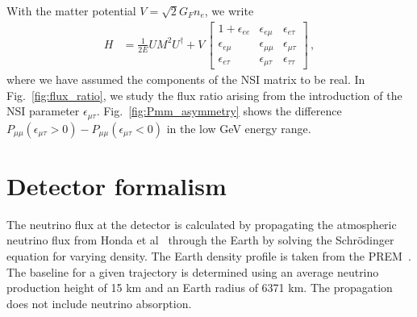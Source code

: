 \documentclass[draft=True]{revtex4-2}
\newcommand{\emt}{\ensuremath{\epsilon_{\mu\tau}}}
\begin{document}
With the matter potential $V = \sqrt{2}G_F n_e$, we write
\begin{align} \label{eq:H_NSI}
   H &= \frac{1}{2E} UM^2U^\dagger + V\,
   \begin{bmatrix}
      1 + \epsilon_{ee} & \epsilon_{e\mu} & \epsilon_{e\tau}  \\
      \epsilon_{e\mu} & \epsilon_{\mu\mu} & \epsilon_{\mu\tau}  \\
      \epsilon_{e \tau} & \epsilon_{\mu\tau} & \epsilon_{\tau\tau}
  \end{bmatrix}\,,
\end{align}
where we have assumed the components of the NSI matrix to be real. In Fig.~\ref{fig:flux_ratio}, we study
the flux ratio arising from the introduction of the NSI parameter $\emt$. Fig.~\ref{fig:Pmm_asymmetry} shows the difference $P_{\mu\mu}(\emt>0) - P_{\mu\mu}(\emt<0)$ in the low \si{\GeV} energy range. 

\section{Detector formalism}
The neutrino flux at the detector is calculated by propagating the atmospheric neutrino flux from Honda et al~\cite{hondapaper} through the Earth by solving the 
Schrödinger equation for varying density. The Earth density profile is taken from the PREM~\cite{PREM}. The baseline for a given trajectory is determined using an average neutrino
production height of 15 km and an Earth radius of 6371 km. The propagation does not include neutrino absorption.
\end{document}
